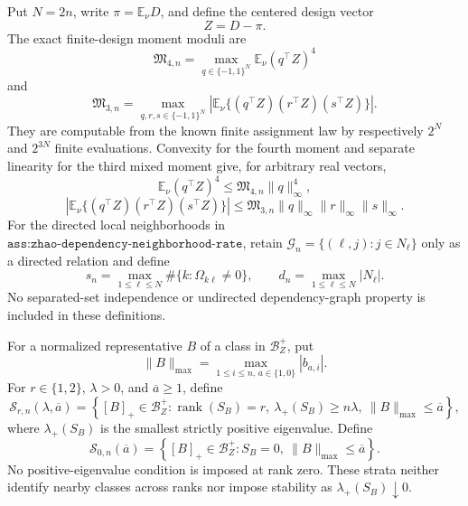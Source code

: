 Put \(N=2n\), write \(\pi=\mathbb E_\nu D\), and define the centered design vector
\[
Z=D-\pi.
\]
The exact finite-design moment moduli are
\[
\mathfrak M_{4,n}
=\max_{q\in\{-1,1\}^{N}}\mathbb E_\nu(q^{\top}Z)^4
\]
and
\[
\mathfrak M_{3,n}
=\max_{q,r,s\in\{-1,1\}^{N}}
\left|\mathbb E_\nu\{(q^{\top}Z)(r^{\top}Z)(s^{\top}Z)\}\right|.
\]
They are computable from the known finite assignment law by respectively \(2^N\) and \(2^{3N}\) finite evaluations.  Convexity for the fourth moment and separate linearity for the third mixed moment give, for arbitrary real vectors,
\[
\mathbb E_\nu(q^{\top}Z)^4
\le\mathfrak M_{4,n}\lVert q\rVert_\infty^4,
\]
\[
\left|\mathbb E_\nu\{(q^{\top}Z)(r^{\top}Z)(s^{\top}Z)\}\right|
\le\mathfrak M_{3,n}\lVert q\rVert_\infty
\lVert r\rVert_\infty\lVert s\rVert_\infty.
\]
For the directed local neighborhoods in \(\texttt{ass:zhao-dependency-neighborhood-rate}\), retain \(\mathcal G_n=\{(\ell,j):j\in N_\ell\}\) only as a directed relation and define
\[
s_n=\max_{1\le \ell\le N}\#\{k:\Omega_{k\ell}\ne0\},
\qquad
d_n=\max_{1\le \ell\le N}\lvert N_\ell\rvert.
\]
No separated-set independence or undirected dependency-graph property is included in these definitions.

For a normalized representative \(B\) of a class in \(\mathcal B_Z^+\), put
\[
\lVert B\rVert_{\max}
=\max_{1\le i\le n,\,a\in\{1,0\}}|b_{a,i}|.
\]
For \(r\in\{1,2\}\), \(\lambda>0\), and \(\overline a\ge1\), define
\[
\mathcal S_{r,n}(\lambda,\overline a)
=\left\{[B]_+\in\mathcal B_Z^+:
\operatorname{rank}(S_B)=r,\ 
\lambda_+(S_B)\ge n\lambda,\ 
\lVert B\rVert_{\max}\le\overline a\right\},
\]
where \(\lambda_+(S_B)\) is the smallest strictly positive eigenvalue.  Define
\[
\mathcal S_{0,n}(\overline a)
=\left\{[B]_+\in\mathcal B_Z^+:S_B=0,\ 
\lVert B\rVert_{\max}\le\overline a\right\}.
\]
No positive-eigenvalue condition is imposed at rank zero.  These strata neither identify nearby classes across ranks nor impose stability as \(\lambda_+(S_B)\downarrow0\).